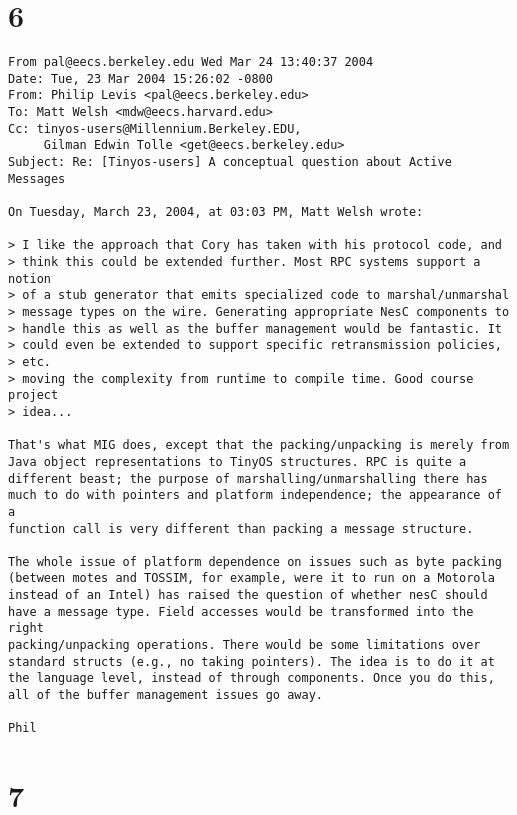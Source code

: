 \documentclass[10pt]{article}
\begin{document}
\section*{6}

\begin{verbatim}
From pal@eecs.berkeley.edu Wed Mar 24 13:40:37 2004
Date: Tue, 23 Mar 2004 15:26:02 -0800
From: Philip Levis <pal@eecs.berkeley.edu>
To: Matt Welsh <mdw@eecs.harvard.edu>
Cc: tinyos-users@Millennium.Berkeley.EDU,
     Gilman Edwin Tolle <get@eecs.berkeley.edu>
Subject: Re: [Tinyos-users] A conceptual question about Active Messages

On Tuesday, March 23, 2004, at 03:03 PM, Matt Welsh wrote:

> I like the approach that Cory has taken with his protocol code, and
> think this could be extended further. Most RPC systems support a notion
> of a stub generator that emits specialized code to marshal/unmarshal
> message types on the wire. Generating appropriate NesC components to
> handle this as well as the buffer management would be fantastic. It
> could even be extended to support specific retransmission policies, 
> etc.
> moving the complexity from runtime to compile time. Good course project
> idea...

That's what MIG does, except that the packing/unpacking is merely from 
Java object representations to TinyOS structures. RPC is quite a 
different beast; the purpose of marshalling/unmarshalling there has 
much to do with pointers and platform independence; the appearance of a 
function call is very different than packing a message structure.

The whole issue of platform dependence on issues such as byte packing 
(between motes and TOSSIM, for example, were it to run on a Motorola 
instead of an Intel) has raised the question of whether nesC should 
have a message type. Field accesses would be transformed into the right 
packing/unpacking operations. There would be some limitations over 
standard structs (e.g., no taking pointers). The idea is to do it at 
the language level, instead of through components. Once you do this, 
all of the buffer management issues go away.

Phil

\end{verbatim}

\section*{7}
\end{document}
